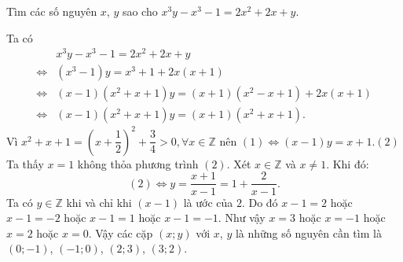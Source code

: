\begin{bt}%
\hfill
Tìm các số nguyên  $x$, $y$  sao cho $x^{3}y-x^{3}-1=2x^{2}+2x+y$.

\loigiai
{
	Ta có 
	{\allowdisplaybreaks
		\begin{align*}
		&x^3y - x^3 - 1 = 2x^2 + 2x + y \\
		\Leftrightarrow& (x^3 - 1)y = x^3 + 1 + 2x(x + 1)\\
		\Leftrightarrow& (x - 1)(x^2 + x + 1)y = (x + 1)(x^2 - x + 1) + 2x(x + 1)\\                         
		\Leftrightarrow& (x - 1)(x^2 + x + 1)y = (x + 1)(x^2 + x + 1).\tag{1}
		\end{align*}}Vì $x^2 + x + 1 = \left( x + \dfrac{1}{2} \right)^2 + \dfrac{3}{4} > 0,\forall x \in \mathbb{Z}$ nên 
	$(1) \Leftrightarrow (x - 1)y = x + 1$.\hfill$(2)$\\
	Ta thấy $x = 1$ không thỏa phương trình $(2)$. Xét $x \in \mathbb{Z}$ và $x \ne 1$. Khi đó:
	\[(2) \Leftrightarrow y = \frac{x + 1}{x - 1} = 1 + \frac{2}{x - 1}.\]
	Ta có $y \in \mathbb{Z}$ khi và chỉ khi $\left( x - 1 \right)$ là ước của $2$. 
	Do đó $x - 1 = 2$ hoặc $x - 1 =  - 2$ hoặc $x - 1 = 1$ hoặc $x - 1 =  - 1$. Như vậy $x = 3$ hoặc $x =  - 1$ hoặc $x = 2$ hoặc $x = 0$.        Vậy các cặp $(x;y)$ với $x$, $y$ là những số nguyên cần tìm là $(0; - 1)$, $( - 1;0)$, $(2;3)$, $(3;2)$.
}
\end{bt}

